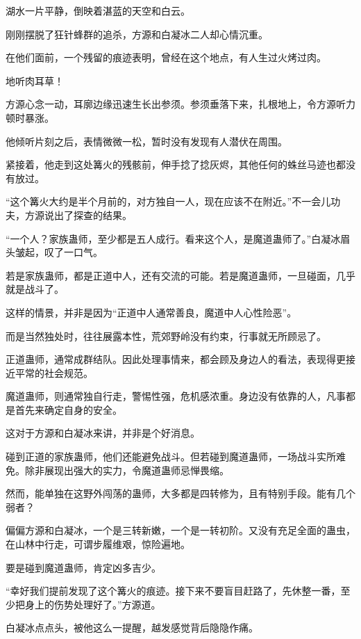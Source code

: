 
\begin{this_body}



湖水一片平静，倒映着湛蓝的天空和白云。

刚刚摆脱了狂针蜂群的追杀，方源和白凝冰二人却心情沉重。

在他们面前，一个残留的痕迹表明，曾经在这个地点，有人生过火烤过肉。

地听肉耳草！

方源心念一动，耳廓边缘迅速生长出参须。参须垂落下来，扎根地上，令方源听力顿时暴涨。

他倾听片刻之后，表情微微一松，暂时没有发现有人潜伏在周围。

紧接着，他走到这处篝火的残骸前，伸手捻了捻灰烬，其他任何的蛛丝马迹也都没有放过。

“这个篝火大约是半个月前的，对方独自一人，现在应该不在附近。”不一会儿功夫，方源说出了探查的结果。

“一个人？家族蛊师，至少都是五人成行。看来这个人，是魔道蛊师了。”白凝冰眉头皱起，叹了一口气。

若是家族蛊师，都是正道中人，还有交流的可能。若是魔道蛊师，一旦碰面，几乎就是战斗了。

这样的情景，并非是因为“正道中人通常善良，魔道中人心性险恶”。

而是当然独处时，往往展露本性，荒郊野岭没有约束，行事就无所顾忌了。

正道蛊师，通常成群结队。因此处理事情来，都会顾及身边人的看法，表现得更接近平常的社会规范。

魔道蛊师，则通常独自行走，警惕性强，危机感浓重。身边没有依靠的人，凡事都是首先来确定自身的安全。

这对于方源和白凝冰来讲，并非是个好消息。

碰到正道的家族蛊师，他们还能避免战斗。但若碰到魔道蛊师，一场战斗实所难免。除非展现出强大的实力，令魔道蛊师忌惮畏缩。

然而，能单独在这野外闯荡的蛊师，大多都是四转修为，且有特别手段。能有几个弱者？

偏偏方源和白凝冰，一个是三转新嫩，一个是一转初阶。又没有充足全面的蛊虫，在山林中行走，可谓步履维艰，惊险遍地。

要是碰到魔道蛊师，肯定凶多吉少。

“幸好我们提前发现了这个篝火的痕迹。接下来不要盲目赶路了，先休整一番，至少把身上的伤势处理好了。”方源道。

白凝冰点点头，被他这么一提醒，越发感觉背后隐隐作痛。


\end{this_body}

